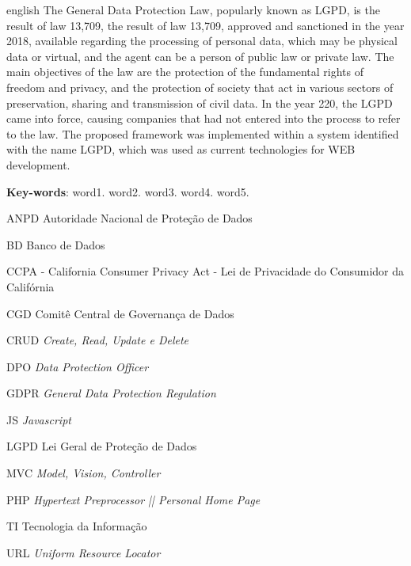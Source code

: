 \documentclass[
	12pt,				%
	openright,			%
	oneside,			%
	a4paper,			%
	english,			%
	french,				%
	spanish,			%
	brazil,				%
	]{abntex2}
\begin{document}
\begin{resumo}[Abstract]
 \begin{otherlanguage*}{english}
   \vspace{\onelineskip}
    \noindent 
The General Data Protection Law, popularly known as LGPD, is the result of law 13,709, the result of law 13,709, approved and sanctioned in the year 2018, available regarding the processing of personal data, which may be physical data or virtual, and the agent can be a person of public law or private law. The main objectives of the law are the protection of the fundamental rights of freedom and privacy, and the protection of society that act in various sectors of preservation, sharing and transmission of civil data. In the year 220, the LGPD came into force, causing companies that had not entered into the process to refer to the law. The proposed framework was implemented within a system identified with the name LGPD, which was used as current technologies for WEB development.
   
   \vspace{\onelineskip}
   
   \noindent  \textbf{Key-words}:  word1. word2. word3. word4. word5.
 \end{otherlanguage*}
\end{resumo}

\listoffigures*
\cleardoublepage

\listoftables*
\cleardoublepage

\begin{siglas}
    \item[ANPD] Autoridade Nacional de Proteção de Dados
    \item[BD] Banco de Dados
    \item[CCPA] - California Consumer Privacy Act - Lei de Privacidade do Consumidor da Califórnia
    \item[CGD] Comitê Central de Governança de Dados
    \item[CRUD] \textit{Create, Read, Update e Delete}
    \item[DPO] \textit{Data Protection Officer}
    \item[GDPR] \textit{ General Data Protection Regulation}
    \item [JS] \textit{Javascript}
    \item[LGPD] Lei Geral de Proteção de Dados
    \item[MVC] \textit{Model, Vision, Controller}
    \item[PHP] \textit{Hypertext Preprocessor || Personal Home Page}
    \item[TI] Tecnologia da Informação
    \item[URL] \textit{Uniform Resource Locator}
\end{siglas}
\end{document}
